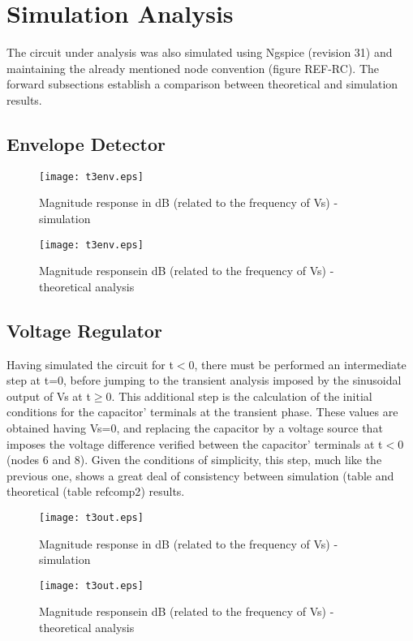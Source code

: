 \section{Simulation Analysis}
\label{sec:simulation}

The circuit under analysis was also simulated using Ngspice (revision 31) and maintaining the already mentioned node convention (figure REF-RC). The forward subsections establish a comparison between theoretical and simulation results.

\subsection{Envelope Detector}




\begin{figure}[h] \centering
  \begin{minipage}{.5\textwidth}
    \texttt{[image: t3env.eps]}
    \caption{Magnitude response in dB (related to the frequency of Vs) - simulation}
    \label{fig:simenv}
    \end{minipage}%
  \begin{minipage}{.5\textwidth}
  \centering
    \texttt{[image: t3env.eps]}
    \caption{Magnitude responsein dB (related to the frequency of Vs) - theoretical analysis }
    \label{fig:compenv}
      \end{minipage}%
\end{figure}

\subsection{Voltage Regulator}

Having simulated the circuit for t$<$0, there must be performed an intermediate step at t=0, before jumping to the transient analysis imposed by the sinusoidal output of Vs at t$\geq$0. This additional step is the calculation of the initial conditions for the capacitor' terminals at the transient phase. These values are obtained having Vs=0, and replacing the capacitor by a voltage source that imposes the voltage difference verified between the capacitor' terminals at t$<$0 (nodes 6 and 8). Given the conditions of simplicity, this step, much like the previous one, shows a great deal of consistency between simulation (table  and theoretical (table ref{comp2}) results. 




\begin{figure}[h] \centering
  \begin{minipage}{.5\textwidth}
    \texttt{[image: t3out.eps]}
    \caption{Magnitude response in dB (related to the frequency of Vs) - simulation}
    \label{fig:simout}
    \end{minipage}%
  \begin{minipage}{.5\textwidth}
  \centering
    \texttt{[image: t3out.eps]}
    \caption{Magnitude responsein dB (related to the frequency of Vs) - theoretical analysis }
    \label{fig:compout}
      \end{minipage}%
\end{figure}

